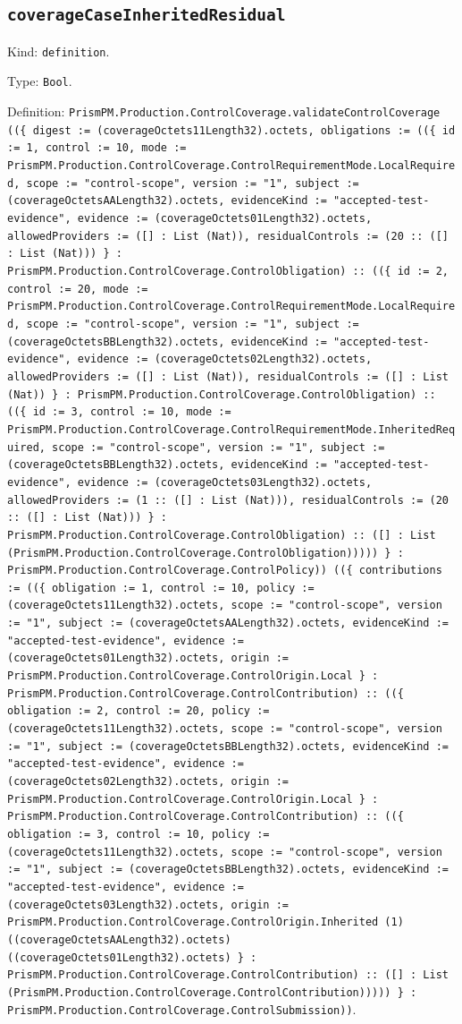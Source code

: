 \documentclass[11pt]{article}
\begin{document}
\subsection*{\texttt{coverageCaseInheritedResidual}}
\noindent Kind: \texttt{definition}.\par
\noindent Type: \texttt{Bool}.\par
\noindent Definition: \texttt{PrismPM.Production.ControlCoverage.validateControlCoverage ((\{ digest := (coverageOctets11Length32).octets, obligations := ((\{ id := 1, control := 10, mode := PrismPM.Production.ControlCoverage.ControlRequirementMode.LocalRequired, scope := "control-scope", version := "1", subject := (coverageOctetsAALength32).octets, evidenceKind := "accepted-test-evidence", evidence := (coverageOctets01Length32).octets, allowedProviders := ([] : List (Nat)), residualControls := (20 :: ([] : List (Nat))) \} : PrismPM.Production.ControlCoverage.ControlObligation) :: ((\{ id := 2, control := 20, mode := PrismPM.Production.ControlCoverage.ControlRequirementMode.LocalRequired, scope := "control-scope", version := "1", subject := (coverageOctetsBBLength32).octets, evidenceKind := "accepted-test-evidence", evidence := (coverageOctets02Length32).octets, allowedProviders := ([] : List (Nat)), residualControls := ([] : List (Nat)) \} : PrismPM.Production.ControlCoverage.ControlObligation) :: ((\{ id := 3, control := 10, mode := PrismPM.Production.ControlCoverage.ControlRequirementMode.InheritedRequired, scope := "control-scope", version := "1", subject := (coverageOctetsBBLength32).octets, evidenceKind := "accepted-test-evidence", evidence := (coverageOctets03Length32).octets, allowedProviders := (1 :: ([] : List (Nat))), residualControls := (20 :: ([] : List (Nat))) \} : PrismPM.Production.ControlCoverage.ControlObligation) :: ([] : List (PrismPM.Production.ControlCoverage.ControlObligation))))) \} : PrismPM.Production.ControlCoverage.ControlPolicy)) ((\{ contributions := ((\{ obligation := 1, control := 10, policy := (coverageOctets11Length32).octets, scope := "control-scope", version := "1", subject := (coverageOctetsAALength32).octets, evidenceKind := "accepted-test-evidence", evidence := (coverageOctets01Length32).octets, origin := PrismPM.Production.ControlCoverage.ControlOrigin.Local \} : PrismPM.Production.ControlCoverage.ControlContribution) :: ((\{ obligation := 2, control := 20, policy := (coverageOctets11Length32).octets, scope := "control-scope", version := "1", subject := (coverageOctetsBBLength32).octets, evidenceKind := "accepted-test-evidence", evidence := (coverageOctets02Length32).octets, origin := PrismPM.Production.ControlCoverage.ControlOrigin.Local \} : PrismPM.Production.ControlCoverage.ControlContribution) :: ((\{ obligation := 3, control := 10, policy := (coverageOctets11Length32).octets, scope := "control-scope", version := "1", subject := (coverageOctetsBBLength32).octets, evidenceKind := "accepted-test-evidence", evidence := (coverageOctets03Length32).octets, origin := PrismPM.Production.ControlCoverage.ControlOrigin.Inherited (1) ((coverageOctetsAALength32).octets) ((coverageOctets01Length32).octets) \} : PrismPM.Production.ControlCoverage.ControlContribution) :: ([] : List (PrismPM.Production.ControlCoverage.ControlContribution))))) \} : PrismPM.Production.ControlCoverage.ControlSubmission))}.\par
\end{document}
